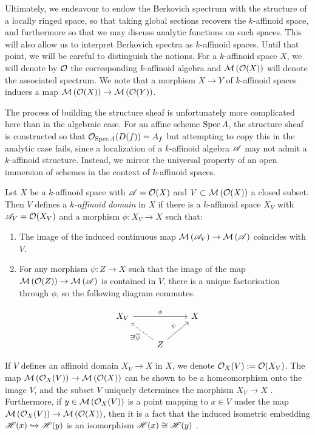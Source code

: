 Ultimately, we endeavour to endow the Berkovich spectrum with the structure of a locally ringed space, so that taking global sections recovers the $k$-affinoid space, and furthermore so that we may discuss analytic functions on such spaces.
This will also allow us to interpret Berkovich spectra as $k$-affinoid spaces.
Until that point, we will be careful to distinguish the notions.
For a $k$-affinoid space $X$, we will denote by $\mathcal{O}$ the corresponding $k$-affinoid algebra and $\mathcal{M}\left(\mathcal{O}(X)\right)$ will denote the associated spectrum.
We note that a morphism $X \to Y$ of $k$-affinoid spaces induces a map $\mathcal{M}\left(\mathcal{O}(X)\right) \to \mathcal{M}\left(\mathcal{O}(Y)\right)$.

The process of building the structure sheaf is unfortunately more complicated here than in the algebraic case. For an affine scheme $\operatorname{Spec} A$, the structure sheaf is constructed so that $\mathcal{O}_{\operatorname{Spec} A}(D(f)) = A_f$ but attempting to copy this in the analytic case fails, since a localization of a $k$-affinoid algebra $\mathscr{A}$ may not admit a $k$-affinoid structure. 
Instead, we mirror the universal property of an open immersion of schemes in the context of $k$-affinoid spaces.

\begin{defn}\parencite[\S 3]{temk2005}
    Let $X$ be a $k$-affinoid space with $\mathscr{A} = \mathcal{O}(X)$ and $V \subset \mathcal{M}\left(\mathcal{O}(X)\right)$ a closed subset. Then $V$ defines a \textit{$k$-affinoid domain} in $X$ if there is a $k$-affinoid space $X_V$ with $\mathscr{A}_V = \mathcal{O}(X_V)$ and a morphism $\phi: X_V \to X$ such that:
    \begin{enumerate}
        \item The image of the induced continuous map $\mathcal{M}\left(\mathscr{A}_V\right) \to \mathcal{M}\left(\mathscr{A}\right)$ coincides with $V$.
        \item For any morphism $\psi: Z \to X$ such that the image of the map $\mathcal{M}\left(\mathcal{O}(Z)\right) \to \mathcal{M}\left(\mathscr{A}\right)$ is contained in $V$, there is a unique factorisation through $\phi$, so the following diagram commutes.
    \end{enumerate}
    \[
    \begin{tikzcd}
        X_V \arrow[rr,"\phi"] && X \\
        & Z \arrow[ur,"\psi"] \arrow[ul,dashed, "\exists ! \overline \psi"]
    \end{tikzcd}
    \]
\end{defn}

If $V$ defines an affinoid domain $X_V \to X$ in $X$, we denote $\mathcal{O}_X(V) := \mathcal{O}(X_V)$. 
The map $\mathcal{M}\left(\mathcal{O}_X(V)\right) \to \mathcal{M}\left(\mathcal{O}(X)\right)$ can be shown to be a homeomorphism onto the image $V$, and the subset $V$ uniquely determines the morphism $X_V \to X$ \parencite[Proposition 2.2.4]{berk1}.
Furthermore, if $y \in \mathcal{M}\left(\mathcal{O}_X(V)\right)$ is a point mapping to $x \in V$ under the map $\mathcal{M}\left(\mathcal{O}_X(V)\right) \to \mathcal{M}\left(\mathcal{O}(X)\right)$, then it is a fact that the induced isometric embedding $\mathscr{H}(x) \xhookrightarrow{} \mathscr{H}(y)$ is an isomorphism $\mathscr{H}(x) \cong \mathscr{H}(y)$ \cite[Fact 3.2.3.2]{temk}.

